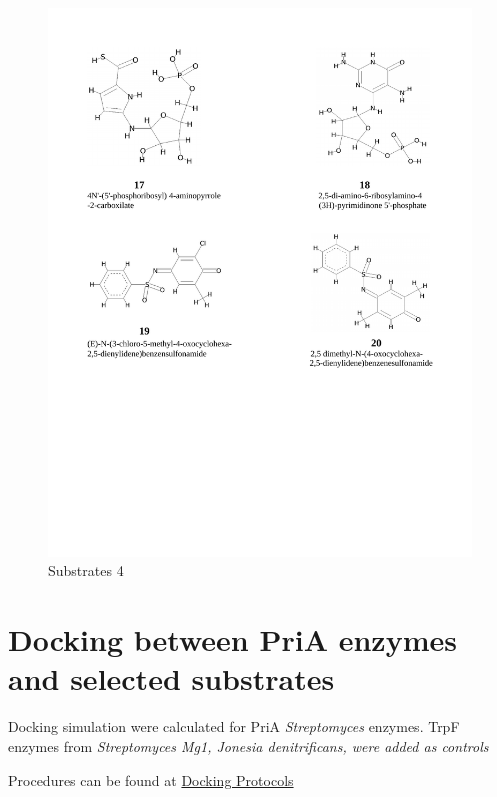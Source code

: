 \documentclass[12pt,twoside]{reedthesis}
\begin{document}
  \begin{figure}[h!tbp]
   \centering
   \includegraphics[angle = 0,scale = 1]{chapter4/esquema_quimico-4-4.pdf}
   \caption[Substrates 4]{\normalsize{Substrates 4}}
   \label{fig:Substrates chemical 4}
   \end{figure}
  
  \section{Docking between PriA enzymes and selected
  substrates}\label{docking-between-pria-enzymes-and-selected-substrates}
  
  Docking simulation were calculated for PriA \emph{Streptomyces} enzymes.
  TrpF enzymes from \emph{Streptomyces Mg1, Jonesia denitrificans, were
  added as controls}
  
  Procedures can be found at
  \href{https://github.com/tripplab/Docking/wiki}{Docking Protocols}
  
\end{document}
